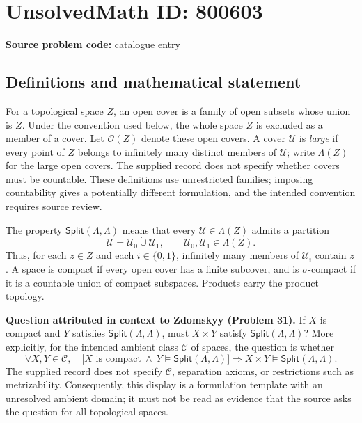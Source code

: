 \documentclass[11pt]{article}
\begin{document}
\section*{UnsolvedMath ID: 800603}
\textbf{Source problem code:} catalogue entry
\subsection{Definitions and mathematical statement}
For a topological space \(Z\), an open cover is a family of open subsets whose union is \(Z\). Under the convention used below, the whole space \(Z\) is excluded as a member of a cover. Let \(\mathcal{O}(Z)\) denote these open covers. A cover \(\mathcal{U}\) is \emph{large} if every point of \(Z\) belongs to infinitely many distinct members of \(\mathcal{U}\); write \(\Lambda(Z)\) for the large open covers. The supplied record does not specify whether covers must be countable. These definitions use unrestricted families; imposing countability gives a potentially different formulation, and the intended convention requires source review.

The property \(\mathsf{Split}(\Lambda,\Lambda)\) means that every \(\mathcal{U}\in\Lambda(Z)\) admits a partition
\[
\mathcal{U}=\mathcal{U}_0\mathbin{\dot\cup}\mathcal{U}_1,
\qquad \mathcal{U}_0,\mathcal{U}_1\in\Lambda(Z).
\]
Thus, for each \(z\in Z\) and each \(i\in\{0,1\}\), infinitely many members of \(\mathcal{U}_i\) contain \(z\). A space is compact if every open cover has a finite subcover, and is \(\sigma\)-compact if it is a countable union of compact subspaces. Products carry the product topology.

\textbf{Question attributed in context to Zdomskyy (Problem 31).} If \(X\) is compact and \(Y\) satisfies \(\mathsf{Split}(\Lambda,\Lambda)\), must \(X\times Y\) satisfy \(\mathsf{Split}(\Lambda,\Lambda)\)? More explicitly, for the intended ambient class \(\mathcal{C}\) of spaces, the question is whether
\[
\forall X,Y\in\mathcal{C},\quad
\bigl[X\text{ is compact}\ \land\ Y\models\mathsf{Split}(\Lambda,\Lambda)\bigr]
\Longrightarrow
X\times Y\models\mathsf{Split}(\Lambda,\Lambda).
\]
The supplied record does not specify \(\mathcal{C}\), separation axioms, or restrictions such as metrizability. Consequently, this display is a formulation template with an unresolved ambient domain; it must not be read as evidence that the source asks the question for all topological spaces.
\end{document}
